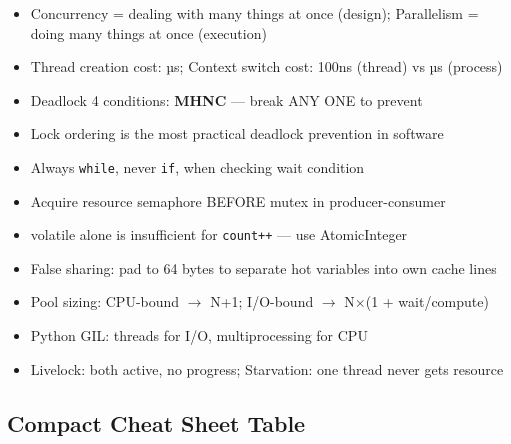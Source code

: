 \documentclass[11pt]{article}
\providecommand{\tightlist}{\setlength{\itemsep}{1pt}\setlength{\parskip}{0pt}}
\begin{document}
\begin{itemize}
\tightlist
\item
  Concurrency = dealing with many things at once (design); Parallelism = doing many things at once (execution)
\item
  Thread creation cost: µs; Context switch cost: 100ns (thread) vs µs (process)
\item
  Deadlock 4 conditions: \textbf{MHNC} --- break ANY ONE to prevent
\item
  Lock ordering is the most practical deadlock prevention in software
\item
  Always \texttt{while}, never \texttt{if}, when checking wait condition
\item
  Acquire resource semaphore BEFORE mutex in producer-consumer
\item
  volatile alone is insufficient for \texttt{count++} --- use AtomicInteger
\item
  False sharing: pad to 64 bytes to separate hot variables into own cache lines
\item
  Pool sizing: CPU-bound \(\rightarrow\) N+1; I/O-bound \(\rightarrow\) N\(\times\)(1 + wait/compute)
\item
  Python GIL: threads for I/O, multiprocessing for CPU
\item
  Livelock: both active, no progress; Starvation: one thread never gets resource
\end{itemize}

\subsection{Compact Cheat Sheet Table}\label{compact-cheat-sheet-table}
\end{document}
